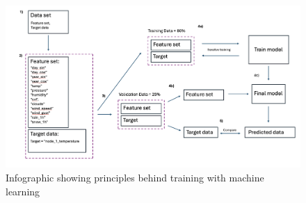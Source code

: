 \begin{figure}[H]
    \centering
    \includegraphics[width=1\textwidth]{contents/part-3/fig3/machine_learning_diagram.png}
    \caption{Infographic showing principles behind training with machine learning}
    \label{fig:machine_diagram}
\end{figure}


